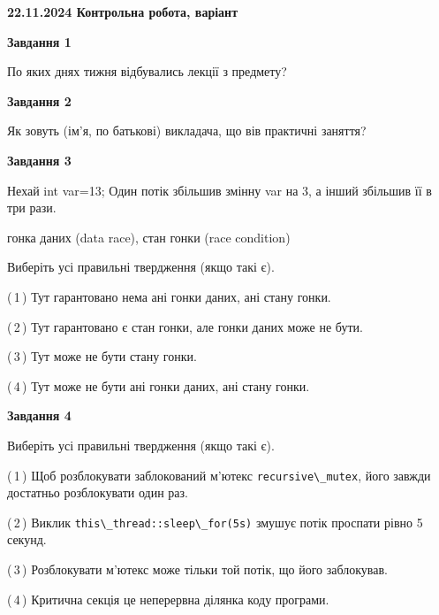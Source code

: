 \documentclass[12pt, ukrainian]{article}
\def\code#1{\Verb!#1!}
\begin{document}
\begin {large}

\textbf{22.11.2024 Контрольна робота, варіант  }\par


{

\begin{center}
\textbf{Завдання 1}
\end{center}

По яких днях тижня відбувались лекції з предмету?


\begin{center}
\textbf{Завдання 2}
\end{center}

Як зовуть (ім'я, по батькові) викладача, що вів практичні заняття?


\begin{center}
\textbf{Завдання 3}
\end{center}

Нехай int var=13; Один потік збільшив змінну var на 3, а інший збільшив її в три рази.

гонка даних (data race), стан гонки (race condition)

Виберіть усі правильні твердження (якщо такі є).\par
\vspace{2mm}
(\,1\,) Тут гарантовано нема ані гонки даних, ані стану гонки.%

(\,2\,) Тут гарантовано є стан гонки, але гонки даних може не бути.%

(\,3\,) Тут може не бути стану гонки.%

(\,4\,) Тут може не бути ані гонки даних, ані стану гонки.%


\begin{center}
\textbf{Завдання 4}
\end{center}

Виберіть усі правильні твердження (якщо такі є).\par
\vspace{2mm}

(\,1\,) Щоб розблокувати заблокований м’ютекс \code{recursive\_mutex}, його завжди достатньо розблокувати один раз.%

(\,2\,) Виклик \code{this\_thread::sleep\_for(5s)} змушує потік проспати рівно 5 секунд.%

(\,3\,) Розблокувати м’ютекс може тільки той потік, що його заблокував.%

(\,4\,) Критична секція це неперервна ділянка коду програми.%


}
\end{large}
\end{document}
